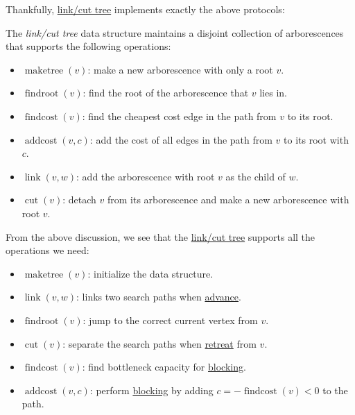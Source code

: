 Thankfully, \hyperref[def:link-cut-tree]{link/cut tree} implements exactly the above protocols:

\begin{definition}\label{def:link-cut-tree}
	The \emph{link/cut tree} data structure maintains a disjoint collection of arborescences that supports the following operations:
	\begin{itemize}
		\item \(\operatorname{maketree}(v) \): make a new arborescence with only a root \(v\).
		\item \(\operatorname{findroot}(v) \): find the root of the arborescence that \(v\) lies in.
		\item \(\operatorname{findcost}(v) \): find the cheapest cost edge in the path from \(v\) to its root.
		\item \(\operatorname{addcost}(v, c) \): add the cost of all edges in the path from \(v\) to its root with \(c\).
		\item \(\operatorname{link}(v, w) \): add the arborescence with root \(v\) as the child of \(w\).
		\item \(\operatorname{cut}(v) \): detach \(v\) from its arborescence and make a new arborescence with root \(v\).
	\end{itemize}
\end{definition}

From the above discussion, we see that the \hyperref[def:link-cut-tree]{link/cut tree} supports all the operations we need:
\begin{itemize}
	\item \(\operatorname{maketree}(v) \): initialize the data structure.
	\item \(\operatorname{link}(v, w) \): links two search paths when \hyperref[algo:adaptive-DFS-advance]{advance}.
	\item \(\operatorname{findroot}(v) \): jump to the correct current vertex from \(v\).
	\item \(\operatorname{cut}(v) \): separate the search paths when \hyperref[algo:adaptive-DFS-retreat]{retreat} from \(v\).
	\item \(\operatorname{findcost}(v) \):  find bottleneck capacity for \hyperref[algo:adaptive-DFS-block]{blocking}.
	\item \(\operatorname{addcost}(v, c) \): perform \hyperref[algo:adaptive-DFS-block]{blocking} by adding \(c = -\operatorname{findcost}(v) <0\) to the path.
\end{itemize}

